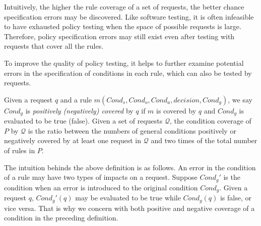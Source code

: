 Intuitively, the higher the rule coverage of a set of requests, the
better chance specification errors may be discovered. Like software
testing, it is often infeasible to have exhausted policy testing
when the space of possible requests is large. Therefore, policy
specification errors may still exist even after testing with
requests that cover all the rules.

To improve the quality of policy testing, it helps to further examine potential errors
in the specification of conditions in each rule, which can also be tested by requests.

\begin{definition}
Given a request $q$ and a rule $m(Cond_s, Cond_o, Cond_a,
decision, Cond_g)$, we say $Cond_g$ is {\em positively
(negatively) covered} by $q$ if $m$ is covered by $q$ and $Cond_g$
is evaluated to be true (false). Given a set of requests
$\mathcal{Q}$, the condition coverage of $P$ by $\mathcal{Q}$ is
the ratio between the numbers of general conditions positively or
negatively covered by at least one request in $\mathcal{Q}$ and
two times of the total number of rules in $P$.
\end{definition}


The intuition behinds the above definition is as follows.
An error in the condition of a rule may have two types of impacts on a request. Suppose
$Cond_g'$ is the condition when an error is introduced to the original condition $Cond_g$.
Given a request $q$, $Cond_g'(q)$ may be evaluated to be true while $Cond_g(q)$ is false,
or vice versa. That is why we concern with both
 positive and negative coverage of a condition in the preceding definition.

